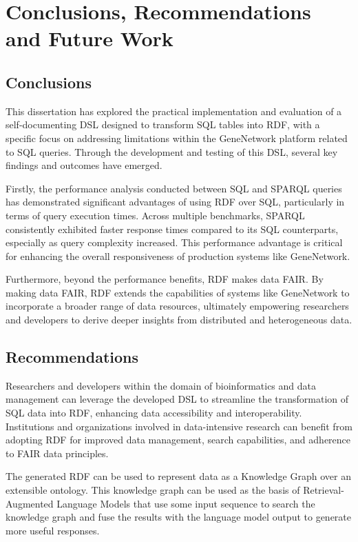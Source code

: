 \chapter{Conclusions, Recommendations and Future Work}

\section{Conclusions}

This dissertation has explored the practical implementation and evaluation of a self-documenting DSL designed to transform SQL tables into RDF, with a specific focus on addressing limitations within the GeneNetwork platform related to SQL queries. Through the development and testing of this DSL, several key findings and outcomes have emerged.

Firstly, the performance analysis conducted between SQL and SPARQL queries has demonstrated significant advantages of using RDF over SQL, particularly in terms of query execution times. Across multiple benchmarks, SPARQL consistently exhibited faster response times compared to its SQL counterparts, especially as query complexity increased. This performance advantage is critical for enhancing the overall responsiveness of production systems like GeneNetwork.

Furthermore, beyond the performance benefits, RDF makes data FAIR.  By making data FAIR, RDF extends the capabilities of systems like GeneNetwork to incorporate a broader range of data resources, ultimately empowering researchers and developers to derive deeper insights from distributed and heterogeneous data.

\section{Recommendations}

Researchers and developers within the domain of bioinformatics and data management can leverage the developed DSL to streamline the transformation of SQL data into RDF, enhancing data accessibility and interoperability. Institutions and organizations involved in data-intensive research can benefit from adopting RDF for improved data management, search capabilities, and adherence to FAIR data principles.

The generated RDF can be used to represent data as a Knowledge Graph over an extensible ontology.  This knowledge graph can be used as the basis of Retrieval-Augmented Language Models that use some input sequence to search the knowledge graph and fuse the results with the language model output to generate more useful responses.

